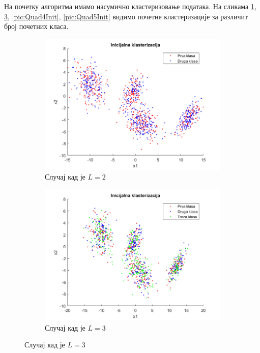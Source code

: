  На почетку алгоритма имамо насумично кластеризовање података.  На сликама  \ref{pic:Quad2Init}, \ref{pic:Quad3Init}, \ref{pic:Quad4Init}, \ref{pic:Quad5Init} видимо почетне кластеризације за различит број почетних класа. 
\begin{figure}[htb!]\caption{Иницијална кластеризација}
\begin{subfigure}{.6\textwidth}
\centering
\includegraphics[width=1\textwidth]{pictures/4/Quad2Init}
\caption{Случај кад је $L=2$}\label{pic:Quad2Init}
\end{subfigure}
\begin{subfigure}{.55\textwidth}
\centering
\includegraphics[width=1\linewidth]{pictures/4/Quad3Init}
\caption{Случај кад је $L=3$}\label{pic:Quad3Init}

\end{subfigure}
\end{figure}
